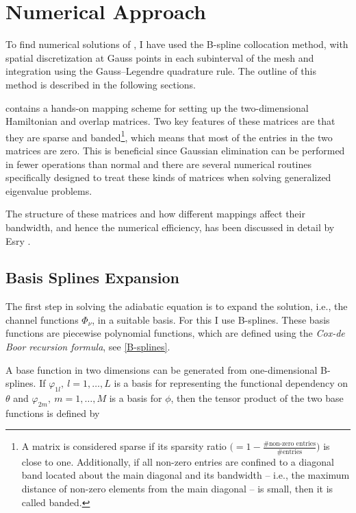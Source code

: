 \chapter{Numerical Approach}\label{chapter:5}
To find numerical solutions of , I have used the B-spline collocation method, with spatial discretization at Gauss points in each subinterval of the mesh and integration using the Gauss--Legendre quadrature rule. The outline of this method is described in the following sections. 

 contains a hands-on mapping scheme for setting up the two-dimensional Hamiltonian and overlap matrices. Two key features of these matrices are that they are sparse and banded\footnote{A matrix is considered sparse if its sparsity ratio $\big(=1 - \frac{\# \text{non-zero entries}}{\#\text{entries}}\big)$ is close to one. Additionally, if all non-zero entries are confined to a diagonal band located about the main diagonal and its bandwidth -- i.e., the maximum distance of non-zero elements from the main diagonal -- is small, then it is called banded.}, which means that most of the entries in the two matrices are zero. This is beneficial since Gaussian elimination can be performed in fewer operations than normal and there are several numerical routines specifically designed to treat these kinds of matrices when solving generalized eigenvalue problems. 

The structure of these matrices and how different mappings affect their bandwidth, and hence the numerical efficiency, has been discussed in detail by Esry \cite{Esry_thesis}.   

\section{Basis Splines Expansion}\label{section:BSexpansion}
The first step in solving the adiabatic equation is to expand the solution, i.e., the channel functions $\Phi_{\nu}$, in a suitable basis. For this I use B-splines. These basis functions are piecewise polynomial functions, which are defined using the \emph{Cox-de Boor recursion formula}, see \cref{B-splines}. 

A base function in two dimensions can be generated from one-dimensional B-splines. If $\varphi_{1l}, \ l= 1,\ldots,L$ is a basis for representing the functional dependency on $\theta$ and $\varphi_{2m}, \ m= 1,\ldots,M$ is a basis for $\phi$, then the tensor product of the two base functions is defined by

